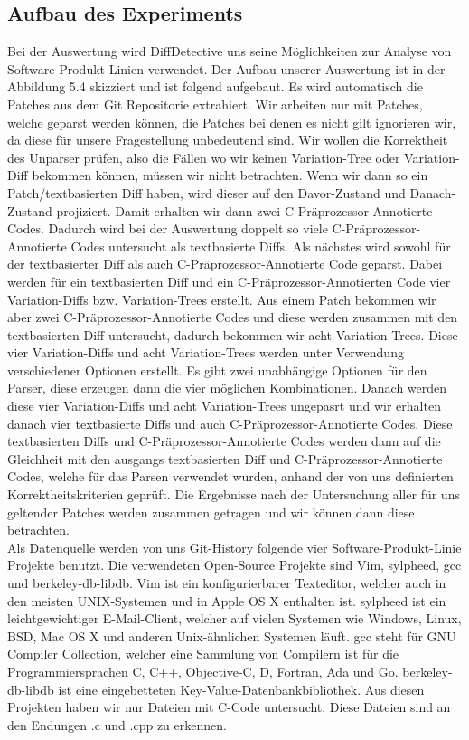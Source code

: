 \subsection{Aufbau des Experiments}
Bei der Auswertung wird DiffDetective uns seine Möglichkeiten zur Analyse von Software-Produkt-Linien verwendet. Der Aufbau unserer Auswertung ist in der Abbildung 5.4 skizziert und ist folgend aufgebaut. Es wird automatisch die Patches aus dem Git Repositorie extrahiert. Wir arbeiten nur mit Patches, welche geparst werden können, die Patches bei denen es nicht gilt ignorieren wir, da diese für unsere Fragestellung unbedeutend sind. Wir wollen die Korrektheit des Unparser prüfen, also die Fällen wo wir keinen Variation-Tree oder Variation-Diff bekommen können, müssen wir nicht betrachten. Wenn wir dann so ein Patch/textbasierten Diff haben, wird dieser auf den Davor-Zustand und Danach-Zustand projiziert. Damit erhalten wir dann zwei C-Präprozessor-Annotierte Codes. Dadurch wird bei der Auswertung doppelt so viele C-Präprozessor-Annotierte Codes untersucht als textbasierte Diffs. Als nächstes wird sowohl für der textbasierter Diff als auch C-Präprozessor-Annotierte Code geparst. Dabei werden für ein textbasierten Diff und ein C-Präprozessor-Annotierten Code vier Variation-Diffs bzw. Variation-Trees erstellt. Aus einem Patch bekommen wir aber zwei C-Präprozessor-Annotierte Codes und diese werden zusammen mit den textbasierten Diff untersucht, dadurch bekommen wir acht Variation-Trees. Diese vier Variation-Diffs und acht Variation-Trees werden unter Verwendung verschiedener Optionen erstellt. Es gibt zwei unabhängige Optionen für den Parser, diese erzeugen dann die vier möglichen Kombinationen. Danach werden diese vier Variation-Diffs und acht Variation-Trees ungepasrt und wir erhalten danach vier textbasierte Diffs und auch C-Präprozessor-Annotierte Codes. Diese textbasierten Diffs und C-Präprozessor-Annotierte Codes werden dann auf die Gleichheit mit den ausgangs textbasierten Diff und C-Präprozessor-Annotierte Codes, welche für das Parsen verwendet wurden, anhand der von uns definierten Korrektheitskriterien geprüft. Die Ergebnisse nach der Untersuchung aller für uns geltender Patches werden zusammen getragen und wir können dann diese betrachten.\\

Als Datenquelle werden von uns Git-History folgende vier Software-Produkt-Linie Projekte benutzt. Die verwendeten Open-Source Projekte sind Vim, sylpheed, gcc und berkeley-db-libdb. Vim ist ein konfigurierbarer Texteditor, welcher auch in den meisten UNIX-Systemen und in Apple OS X enthalten ist. sylpheed ist ein leichtgewichtiger E-Mail-Client, welcher auf vielen Systemen wie Windows, Linux, BSD, Mac OS X und anderen Unix-ähnlichen Systemen läuft. gcc steht für GNU Compiler Collection, welcher eine Sammlung von Compilern ist für die Programmiersprachen C, C++, Objective-C, D, Fortran, Ada und Go. berkeley-db-libdb ist eine eingebetteten Key-Value-Datenbankbibliothek. Aus diesen Projekten haben wir nur Dateien mit C-Code untersucht. Diese Dateien sind an den Endungen .c und .cpp zu erkennen. 

